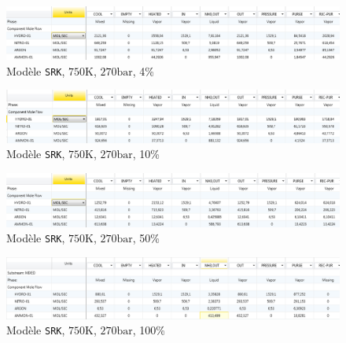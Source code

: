 \begin{figure}[h!]
	\begin{center}
		\includegraphics[scale=0.5]{SRK,750,270,4.png}
	\end{center}
	\caption{Modèle \texttt{SRK}, $750\si{\kelvin}$, $270\si{\bar}$, 4\%}
	\label{fig:SRK,750,270,0.04}
\end{figure}

\begin{figure}[h!]
	\begin{center}
		\includegraphics[scale=0.5]{SRK,750,270,10.png}
	\end{center}
	\caption{Modèle \texttt{SRK}, $750\si{\kelvin}$, $270\si{\bar}$, 10\%}
	\label{fig:SRK,750,270,0.1}
\end{figure}

\begin{figure}[h!]
	\begin{center}
		\includegraphics[scale=0.5]{SRK,750,270,50.png}
	\end{center}
	\caption{Modèle \texttt{SRK}, $750\si{\kelvin}$, $270\si{\bar}$, 50\%}
	\label{fig:SRK,750,270,0.5}
\end{figure}

\begin{figure}[h!]
	\begin{center}
		\includegraphics[scale=0.5]{SRK,750,270,100.png}
	\end{center}
	\caption{Modèle \texttt{SRK}, $750\si{\kelvin}$, $270\si{\bar}$, 100\%}
	\label{fig:SRK,750,270,1}
\end{figure}

